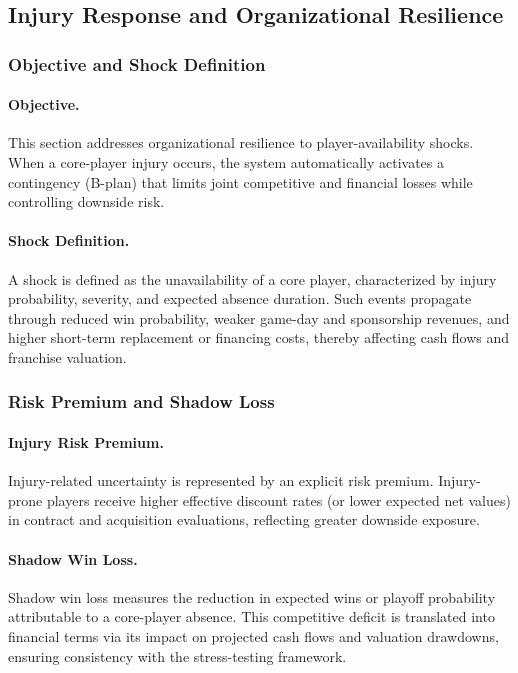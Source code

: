 \documentclass[12pt]{article}
\numberwithin{figure}{section}
\numberwithin{table}{section}
\begin{document}
	
	\subsection{Injury Response and Organizational Resilience}
	
	\subsubsection{Objective and Shock Definition}
	
	\paragraph{Objective.}
	This section addresses organizational resilience to player-availability shocks. 
	When a core-player injury occurs, the system automatically activates a contingency (B-plan) that limits joint competitive and financial losses while controlling downside risk.
	\vspace{-0.5pt}
	
	\paragraph{Shock Definition.}
	A shock is defined as the unavailability of a core player, characterized by injury probability, severity, and expected absence duration. 
	Such events propagate through reduced win probability, weaker game-day and sponsorship revenues, and higher short-term replacement or financing costs, thereby affecting cash flows and franchise valuation.
	
	\subsubsection{Risk Premium and Shadow Loss}
	
	\paragraph{Injury Risk Premium.}
	Injury-related uncertainty is represented by an explicit risk premium. 
	Injury-prone players receive higher effective discount rates (or lower expected net values) in contract and acquisition evaluations, reflecting greater downside exposure.
	\vspace{-0.5pt}
	
	\paragraph{Shadow Win Loss.}
	Shadow win loss measures the reduction in expected wins or playoff probability attributable to a core-player absence. 
	This competitive deficit is translated into financial terms via its impact on projected cash flows and valuation drawdowns, ensuring consistency with the stress-testing framework.
	
\end{document}
